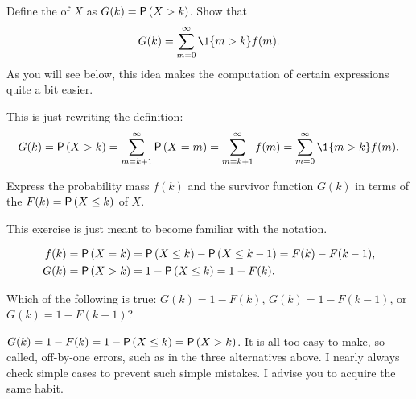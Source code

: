 \begin{exercise}
Define the  of $X$ as $G(k) = \P{X>k}$. Show that
\begin{equation*}
 G(k) = \sum_{m=0}^\infty \1{m>k} f(m).
\end{equation*}
As you will see below, this idea makes the computation of certain expressions quite a bit easier.
\begin{solution}
 This is just rewriting the definition:
\begin{equation*}
G(k) = \P{X>k} = \sum_{m=k+1}^\infty \P{X=m} = \sum_{m=k+1}^\infty f(m)=\sum_{m=0}^\infty \1{m>k}f(m).
\end{equation*}
\end{solution}
\end{exercise}

\begin{exercise}
 Express the probability mass $f(k)$ and the survivor function $G(k)$ in terms of the  $F(k)=\P{X\leq k}$ of $X$.
\begin{hint}
This exercise is just meant to become familiar with the notation.
\end{hint}
\begin{solution}
 \begin{align*}
 f(k) &= \P{X=k} = \P{X\leq k} - \P{X\leq k-1} = F(k)-F(k-1), \\
 G(k) &= \P{X>k} = 1 - \P{X\leq k} = 1-F(k). 
 \end{align*}
\end{solution}
\end{exercise}

\begin{extra}
 Which of the following is true: $G(k) = 1-F(k)$, $G(k) = 1-F(k-1)$, or $G(k) = 1-F(k+1)$?
\begin{solution}
 $G(k) = 1- F(k) = 1-\P{X\leq k} = \P{X>k}$. 
 It is all too easy to make, so called, off-by-one errors, such as
 in the three alternatives above. I nearly always check simple
 cases to prevent such simple mistakes. I advise you to acquire the
 same habit.
\end{solution}
\end{extra}


